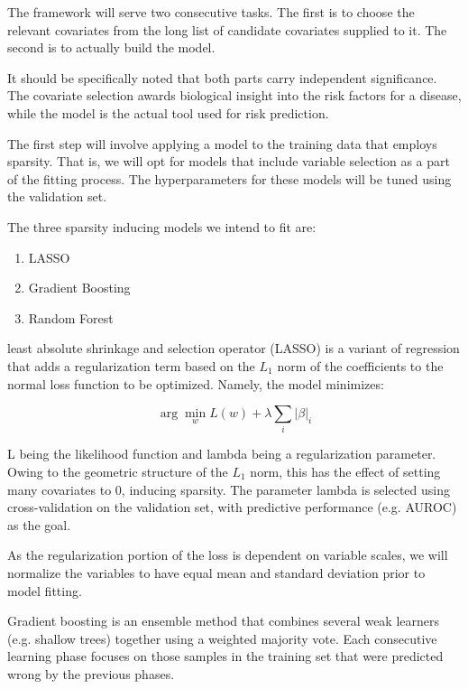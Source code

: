 \documentclass[a4paper,12pt]{article}
\begin{document}
		The framework will serve two consecutive tasks. The first is to choose the relevant covariates from the long list of candidate covariates supplied to it. The second is to actually build the model.
		
		It should be specifically noted that both parts carry independent significance. The covariate selection awards biological insight into the risk factors for a disease, while the model is the actual tool used for risk prediction.
		
		The first step will involve applying a model to the training data that employs sparsity. That is, we will opt for models that include variable selection as a part of the fitting process. The hyperparameters for these models will be tuned using the validation set.
		
		The three sparsity inducing models we intend to fit are:
		\begin{enumerate}
			\item LASSO\cite{Tibshirani2011}
			\item Gradient Boosting\cite{Freund1997}
			\item Random Forest\cite{Breiman2001}
		\end{enumerate}
		
		least absolute shrinkage and selection operator (LASSO) is a variant of regression that adds a regularization term based on the $ L_1 $ norm of the coefficients to the normal loss function to be optimized. Namely, the model minimizes:
		
		\begin{equation*}
		\arg \min_w L(w) + \lambda \sum_{i}|\beta|_i
		\end{equation*}
		
		L being the likelihood function and lambda being a regularization parameter. Owing to the geometric structure of the $ L_1 $ norm, this has the effect of setting many covariates to 0, inducing sparsity. The parameter lambda is selected using cross-validation on the validation set, with predictive performance (e.g. AUROC) as the goal.
		
		As the regularization portion of the loss is dependent on variable scales, we will normalize the variables to have equal mean and standard deviation prior to model fitting.
		
		Gradient boosting is an ensemble method that combines several weak learners (e.g. shallow trees) together using a weighted majority vote. Each consecutive learning phase focuses on those samples in the training set that were predicted wrong by the previous phases.
		
\end{document}
